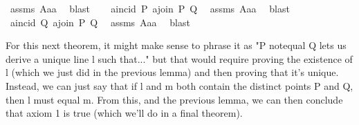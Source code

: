 \begin{isabellebody}
\ assms\ A{}{\isacharunderscore}{\kern0pt}a{}a{}\ \isamarkupfalse%
\ blast\isanewline
\ \ \isamarkupfalse%
\ {\isachardoublequoteopen}a{}incid\ P\ {\isacharparenleft}{\kern0pt}a{}join\ P\ Q{\isacharparenright}{\kern0pt}{\isachardoublequoteclose}\ \isamarkupfalse%
\ assms\ A{}{\isacharunderscore}{\kern0pt}a{}a{}\ \isamarkupfalse%
\ blast\isanewline
\ \ \isamarkupfalse%
\ {\isachardoublequoteopen}a{}incid\ Q\ {\isacharparenleft}{\kern0pt}a{}join\ P\ Q{\isacharparenright}{\kern0pt}{\isachardoublequoteclose}\ \isamarkupfalse%
\ assms\ A{}{\isacharunderscore}{\kern0pt}a{}a{}\ \isamarkupfalse%
\ blast\isanewline
{}\isamarkupfalse%
%
\endisatagproof
{\isafoldproof}%
%
\isadelimproof
%
\endisadelimproof
%
\begin{isamarkuptext}%
\done For this next theorem, it might make sense to phrase it as "P notequal Q lets us derive a unique
line l such that..."
but that would require proving the existence of l (which we just did in the previous lemma) and
then proving that it's unique. Instead, we can just say that if l and m both contain the 
distinct points P and Q, then l must equal m. From this, and the previous lemma, we can then 
conclude that axiom 1 is true (which we'll do in a final theorem). 


\end{isamarkuptext}
\end{isabellebody}
